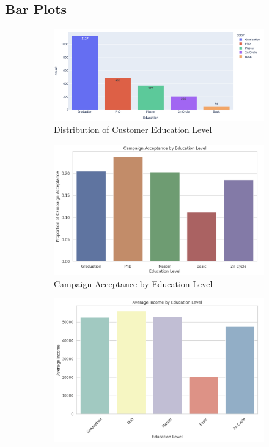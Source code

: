 \documentclass[a4paper]{article}
\begin{document}
\subsection{Bar Plots}
\begin{figure}[h]
    \centering
    \begin{subfigure}{0.32\textwidth}
        \includegraphics[width=\linewidth]{Distribution of Customer Education Level.png}
        \caption{Distribution of Customer Education Level}
        \label{fig:sub1}
    \end{subfigure}
    \hfill
    \begin{subfigure}{0.32\textwidth}
        \includegraphics[width=\linewidth]{Campaign Acceptance by Education Level.png}
        \caption{Campaign Acceptance by Education Level}
        \label{fig:sub2}
    \end{subfigure}
    \hfill
    \begin{subfigure}{0.32\textwidth}
        \includegraphics[width=\linewidth]{Average Income by Education Level.png}

\end{subfigure}
\end{figure}
\end{document}
